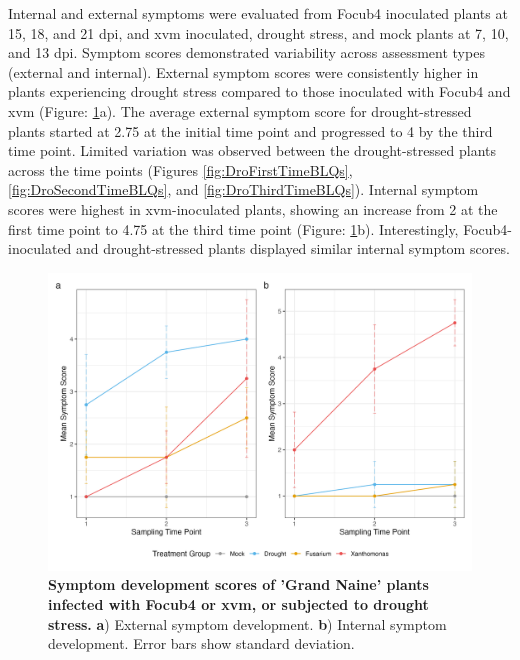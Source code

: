 Internal and external symptoms were evaluated from \ac{Focub4} inoculated plants at 15, 18, and 21 \ac{dpi}, and \ac{xvm} inoculated, drought stress, and mock plants at 7, 10, and 13 \ac{dpi}. Symptom scores demonstrated variability across assessment types (external and internal). External symptom scores were consistently higher in plants experiencing drought stress compared to those inoculated with \ac{Focub4} and \ac{xvm} (Figure: \ref{fig:SymptomDev}a). The average external symptom score for drought-stressed plants started at 2.75 at the initial time point and progressed to 4 by the third time point. Limited variation was observed between the drought-stressed plants across the time points (Figures \ref{fig:DroFirstTimeBLQs},  \ref{fig:DroSecondTimeBLQs}, and \ref{fig:DroThirdTimeBLQs}). Internal symptom scores were highest in \ac{xvm}-inoculated plants, showing an increase from 2 at the first time point to 4.75 at the third time point (Figure: \ref{fig:SymptomDev}b). Interestingly, \ac{Focub4}-inoculated and drought-stressed plants displayed similar internal symptom scores.

\begin{figure}[h!]
    \centering
    \includegraphics[width=\textwidth]{Figures/Combined_Sympotoms_plot.png}
    \caption[Symptom development scores of 'Grand Naine' plants infected with \acl{Focub4} or \acl{xvm}, or subjected to drought stress.]{\textbf{Symptom development scores of 'Grand Naine' plants infected with \acf{Focub4} or \acf{xvm}, or subjected to drought stress.} \textbf{a}) External symptom development. \textbf{b}) Internal symptom development. Error bars show standard deviation.}
    \label{fig:SymptomDev}
\end{figure}


